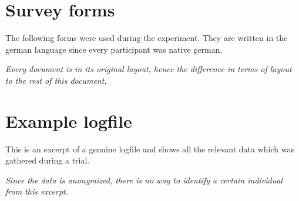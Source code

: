             \section{Survey forms}

                The following forms were used during the experiment. They are written in the german language since every participant was native german. 

                \medskip

                \textit{Every document is in its original layout, hence the difference in terms of layout to the rest of this document.}


                \label{consent}
                \label{q-prior}
                \label{q-post}

            \section{Example logfile}\label{logfile}                

                This is an excerpt of a genuine logfile and shows all the relevant data which was gathered during a trial. 
                
                \medskip

                \textit{Since the data is anonymized, there is no way to identify a certain individual from this excerpt.}

